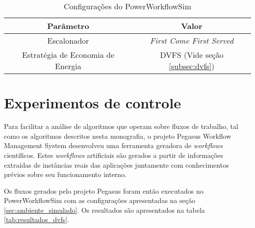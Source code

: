 \begin{table}
	\centering
    \begin{tabular}{|c|c|}
    \hline
    \textbf{Parâmetro}                & \textbf{Valor}     \\ \hline
    Escalonador                       & \emph{First Come First Served}    \\
    Estratégia de Economia de Energia & DVFS (Vide seção \ref{subsec:dvfs}) \\ \hline
    \end{tabular}
    \caption {Configurações do PowerWorkflowSim}
    \label{tab:configuracao_powerworkflowsim}
\end{table}


\section{Experimentos de controle}
\label{sec:experimentos-controle}
Para facilitar a análise de algoritmos que operam sobre fluxos de trabalho,
tal como os algoritmos descritos nesta monografia, o projeto Pegasus Workflow
Management System desenvolveu uma ferramenta geradora de \emph{workflows}
científicos. Estes \emph{workflows} artificiais são gerados a partir de
informações extraídas de instâncias reais das aplicações juntamente com
conhecimentos prévios sobre seu funcionamento interno.
\cite{pegasus:workflowgenerator}

Os fluxos gerados pelo projeto Pegasus foram então executados no
PowerWorkflowSim com as configurações apresentadas na seção 
\ref{sec:ambiente_simulado}. Os resultados são apresentados na tabela 
\ref{tab:resultados_dvfs}.

